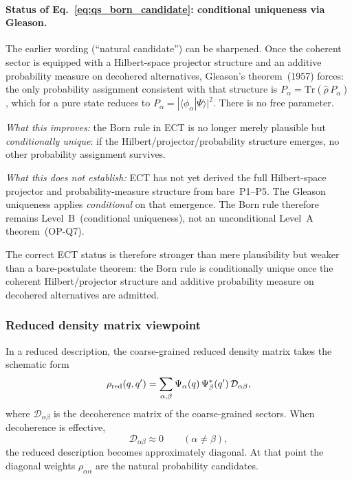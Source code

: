 \paragraph{Status of Eq.~\eqref{eq:qs_born_candidate}:
conditional uniqueness via Gleason.}
The earlier wording (``natural candidate'') can be sharpened.
Once the coherent sector is equipped with a Hilbert-space
projector structure and an additive probability measure on
decohered alternatives, Gleason's theorem~(1957) forces:
the only probability assignment consistent with that structure is
$P_\alpha=\mathrm{Tr}(\hat\rho\,P_\alpha)$, which for a pure
state reduces to $P_\alpha=|\langle\phi_\alpha|\Psi\rangle|^2$.
There is no free parameter.

\textit{What this improves:}
the Born rule in ECT is no longer merely plausible but
\emph{conditionally unique}: if the Hilbert/projector/probability
structure emerges, no other probability assignment survives.

\textit{What this does not establish:}
ECT has not yet derived the full Hilbert-space projector and
probability-measure structure from bare~P1--P5.
The Gleason uniqueness applies \emph{conditional} on that emergence.
The Born rule therefore remains Level~B~(conditional uniqueness),
not an unconditional Level~A theorem~(OP-Q7).

The correct ECT status is therefore stronger than mere plausibility
but weaker than a bare-postulate theorem: the Born rule is
conditionally unique once the coherent Hilbert/projector structure
and additive probability measure on decohered alternatives are
admitted.

\subsubsection*{Reduced density matrix viewpoint}

In a reduced description, the coarse-grained reduced density matrix
takes the schematic form
\begin{equation}
  \label{eq:qs_rho_red}
  \rho_{\rm red}(q,q')
  =
  \sum_{\alpha,\beta}
  \Psi_\alpha(q)\,\Psi_\beta^*(q')\,
  \mathcal{D}_{\alpha\beta},
\end{equation}
where $\mathcal{D}_{\alpha\beta}$ is the decoherence matrix of the
coarse-grained sectors.
When decoherence is effective,
\begin{equation}
  \label{eq:qs_diag_limit}
  \mathcal{D}_{\alpha\beta} \approx 0
  \qquad (\alpha\neq\beta),
\end{equation}
the reduced description becomes approximately diagonal.
At that point the diagonal weights $\rho_{\alpha\alpha}$ are the
natural probability candidates.


